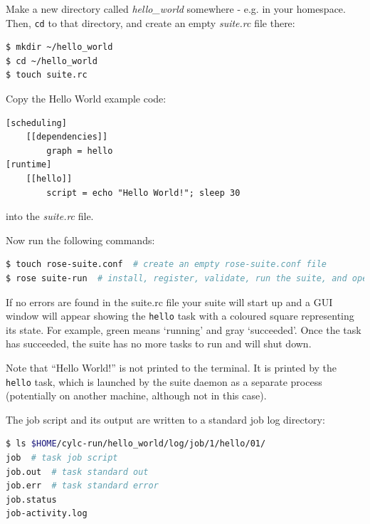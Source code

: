 \begin{shaded*}

Make a new directory called {\em hello\_world} somewhere - e.g. in your homespace.
Then, \lstinline{cd} to that directory, and create an empty {\em suite.rc} file
there:

\begin{lstlisting}[language=bash]
$ mkdir ~/hello_world
$ cd ~/hello_world
$ touch suite.rc
\end{lstlisting}

Copy the Hello World example code:

\begin{lstlisting}[language=suiterc]
[scheduling]
    [[dependencies]]
        graph = hello
[runtime]
    [[hello]]
        script = echo "Hello World!"; sleep 30
\end{lstlisting}

into the {\em suite.rc} file.

Now run the following commands:

\begin{lstlisting}[language=bash]
$ touch rose-suite.conf  # create an empty rose-suite.conf file
$ rose suite-run  # install, register, validate, run the suite, and open the GUI
\end{lstlisting}

If no errors are found in the suite.rc file your suite will start up and a
GUI window will appear showing the \lstinline{hello} task with a coloured
square representing its state. For example, green means `running' and gray
`succeeded'.  Once the task has succeeded, the suite has no more tasks to run
and will shut down.

Note that ``Hello World!'' is not printed to the terminal. It is printed by 
the \lstinline=hello= task, which is launched by the suite daemon as a separate
process (potentially on another machine, although not in this case).


The job script and its output are written to a standard job log directory:

\begin{lstlisting}[language=bash]
$ ls $HOME/cylc-run/hello_world/log/job/1/hello/01/
job  # task job script
job.out  # task standard out
job.err  # task standard error
job.status
job-activity.log
\end{lstlisting}


\end{shaded*}

